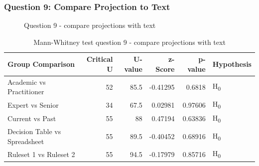 \subsubsection{Question 9: Compare Projection to Text}

\begin{figure}
    \centering
    \caption{Question 9 - compare projections with text}
    \label{fig:stackedbar_Q5}
\end{figure}

\begin{table}
    \begin{center}
        \begin{tabular}{ |l ||r |r |r | r|l | } 
            \hline
            Group Comparison                 & Critical U & U-value & z-Score  & p-value & Hypothesis         \\
            \hline
            \hline
            Academic vs Practitioner         & 52         & 85.5    & -0.41295 & 0.6818  & H\textsubscript{0} \\ 
            \hline
            Expert vs Senior                 & 34         & 67.5    & 0.02981  & 0.97606 & H\textsubscript{0} \\ 
            \hline
            Current vs Past                  & 55         & 88      & 0.47194  & 0.63836 & H\textsubscript{0} \\ 
            \hline
            Decision Table vs Spreadsheet    & 55         & 89.5    & -0.40452 & 0.68916 & H\textsubscript{0} \\ 
            \hline
            Ruleset 1 vs Ruleset 2           & 55         & 94.5    & -0.17979 & 0.85716 & H\textsubscript{0} \\ 
            \hline
        \end{tabular}
    \end{center}
    \caption{Mann-Whitney test question 9 - compare projections with text}
    \label{table:mannwhitneyQ5}
\end{table}

